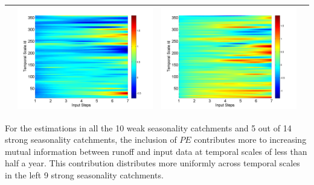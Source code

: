 \documentclass[draft,wrr]{AGUTeX}
\begin{document}
\begin{article}
\begin{table}[H]
\begin{tabular}{cccc}
&\begin{minipage}{.3\textwidth}\includegraphics[width=\linewidth]{resultgraph/06810000diff_ep.png}\end{minipage}
&\begin{minipage}{.3\textwidth}\includegraphics[width=\linewidth]{resultgraph/06810000diff_q.png}\end{minipage}
\\
\hline
\end{tabular}
\end{table}

For the estimations in all the 10 weak seasonality catchments and 5 out of 14 strong seasonality catchments, the inclusion of $PE$  contributes more to increasing mutual information between runoff and input data at temporal scales of less than half a year. This contribution distributes more uniformly across temporal scales in the left 9 strong seasonality catchments. 


\end{article}
\end{document}
